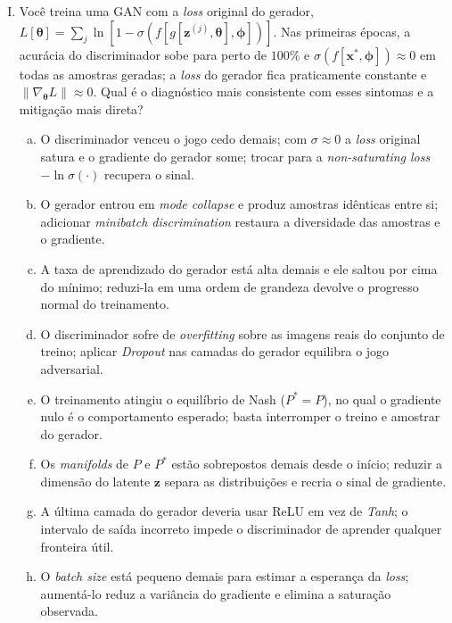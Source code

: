 \documentclass{dlproblemset}
\newcommand{\thetav}{\boldsymbol{\theta}}
\begin{document}
\begin{enumerate}[I)]
\item Você treina uma GAN com a \emph{loss} original do gerador, $L[\thetav] = \sum_{j} \ln\!\left[1 - \sigma\!\left(f\!\left[g[\mathbf{z}^{(j)},\thetav],\boldsymbol{\phi}\right]\right)\right]$. Nas primeiras épocas, a acurácia do discriminador sobe para perto de $100\%$ e $\sigma(f[\mathbf{x}^{*},\boldsymbol{\phi}]) \approx 0$ em todas as amostras geradas; a \emph{loss} do gerador fica praticamente constante e $\|\nabla_{\thetav} L\| \approx 0$. Qual é o diagnóstico mais consistente com esses sintomas e a mitigação mais direta?
\begin{enumerate}[(a)]
    \item O discriminador venceu o jogo cedo demais; com $\sigma \approx 0$ a \emph{loss} original satura e o gradiente do gerador some; trocar para a \textit{non-saturating loss} $-\ln \sigma(\cdot)$ recupera o sinal.
    \item O gerador entrou em \textit{mode collapse} e produz amostras idênticas entre si; adicionar \textit{minibatch discrimination} restaura a diversidade das amostras e o gradiente.
    \item A taxa de aprendizado do gerador está alta demais e ele saltou por cima do mínimo; reduzi-la em uma ordem de grandeza devolve o progresso normal do treinamento.
    \item O discriminador sofre de \textit{overfitting} sobre as imagens reais do conjunto de treino; aplicar \textit{Dropout} nas camadas do gerador equilibra o jogo adversarial.
    \item O treinamento atingiu o equilíbrio de Nash ($P^{*} = P$), no qual o gradiente nulo é o comportamento esperado; basta interromper o treino e amostrar do gerador.
    \item Os \textit{manifolds} de $P$ e $P^{*}$ estão sobrepostos demais desde o início; reduzir a dimensão do latente $\mathbf{z}$ separa as distribuições e recria o sinal de gradiente.
    \item A última camada do gerador deveria usar ReLU em vez de \emph{Tanh}; o intervalo de saída incorreto impede o discriminador de aprender qualquer fronteira útil.
    \item O \textit{batch size} está pequeno demais para estimar a esperança da \emph{loss}; aumentá-lo reduz a variância do gradiente e elimina a saturação observada.
\end{enumerate}


\end{enumerate}
\end{document}
